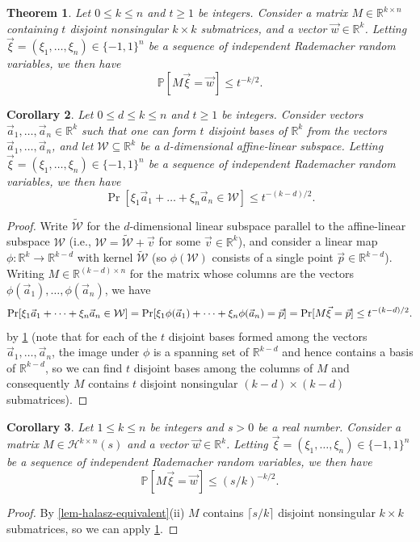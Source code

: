 \documentclass[english]{article}
\newtheorem{theorem}{Theorem}[section]
\newtheorem{corollary}[theorem]{Corollary}
\theoremstyle{remark}
\numberwithin{equation}{section}
\numberwithin{figure}{section}
\newcommand{\su}{\subseteq}
\newcommand{\PP}{\mathbb{P}}
\newcommand{\RR}{\mathbb{R}}
\newcommand{\mc}{\mathcal}
\let\originalleft\left
\let\originalright\right
\renewcommand{\left}{\mathopen{}\mathclose\bgroup\originalleft}
\renewcommand{\right}{\aftergroup\egroup\originalright}
\begin{document}
\begin{theorem}\label{thm-Halasz-FJZ}
Let $0\le k\le n$ and $t\ge 1$ be integers. Consider a matrix $M\in \RR^{k\times n}$ containing $t$ disjoint nonsingular $k\times k$ submatrices, and a vector $\vec{w}\in \RR^k$. Letting $\vec{\xi}=(\xi_{1},\dots,\xi_{n})\in\{-1,1\}^n$ be a sequence of independent Rademacher random variables, we then have
\[\PP[M\vec{\xi}=\vec{w}]\le t^{-k/2}.\]
\end{theorem}

\begin{corollary}\label{cor:halasz}
Let $0\le d\le k\le n$ and $t\ge 1$ be integers. Consider vectors $\vec{a}_{1},\dots,\vec{a}_{n}\in\mathbb{R}^{k}$
such that one can form $t$ disjoint bases of $\RR^k$ from the vectors $\vec{a}_{1},\dots, \vec{a}_{n}$, and let $\mathcal{W}\su \RR^k$ be a $d$-dimensional affine-linear subspace.
Letting $\vec{\xi}=(\xi_{1},\dots,\xi_{n})\in\{-1,1\}^{n}$ be a sequence of independent Rademacher
random variables, we then have
\[
\Pr[\xi_{1}\vec{a}_{1}+\dots+\xi_{n}\vec{a}_{n}\in\mathcal{W}]\le t^{-(k-d)/2}.
\]
\end{corollary}

\begin{proof}
Write $\tilde{\mathcal{W}}$ for the $d$-dimensional linear subspace
parallel to the affine-linear subspace $\mathcal{W}$ (i.e., $\mathcal{W}=\tilde{\mathcal{W}}+\vec{v}$
for some $\vec{v}\in\RR^{k}$), and
consider a linear map $\phi:\RR^{k}\to\RR^{k-d}$ with kernel $\tilde{\mc W}$ (so $\phi(\mathcal{W})$ consists of a single point $\vec{p}\in \RR^{k-d}$). Writing $M\in\RR^{(k-d)\times n}$ for the matrix whose columns
are the vectors $\phi(\vec{a}_{1}),\dots,\phi(\vec{a}_{n})$, we have
\[
\Pr\left[\xi_{1}\vec{a}_{1}+\dots+\xi_{n}\vec{a}_{n}\in\mathcal{W}\right]=\Pr\left[\xi_{1}\phi(\vec{a}_{1})+\dots+\xi_{n}\phi(\vec{a}_{n})=\vec{p}\right]=\Pr[M\vec{\xi}=\vec{p}]\le t^{-(k-d)/2}.
\]
by \cref{thm-Halasz-FJZ} (note that for each of the $t$ disjoint bases formed among the vectors $\vec{a}_{1},\dots, \vec{a}_{n}$, the image under $\phi$ is a spanning set of $\RR^{k-d}$ and hence contains a basis of $\RR^{k-d}$, so we can find $t$ disjoint bases among the columns of $M$ and consequently $M$ contains $t$ disjoint nonsingular $(k-d)\times (k-d)$ submatrices).
\end{proof}

\begin{corollary}\label{cor:halasz-sub-version}
    Let $1\le k\le n$ be integers and $s >0$ be a real number. Consider a matrix $M\in \mathcal{H}^{k\times n}(s)$ and a vector $\vec{w}\in \RR^k$. Letting $\vec{\xi}=(\xi_{1},\dots,\xi_{n})\in\{-1,1\}^n$ be a sequence of independent Rademacher random variables, we then have
\[\PP[M\vec{\xi}=\vec{w}]\le (s/k)^{-k/2}.\]
\end{corollary}
\begin{proof}
    By \cref{lem-halasz-equivalent}(ii) $M$ contains $\lceil s/k\rceil$ disjoint nonsingular $k\times k$ submatrices, so we can apply \cref{thm-Halasz-FJZ}.
\end{proof}
\end{document}

